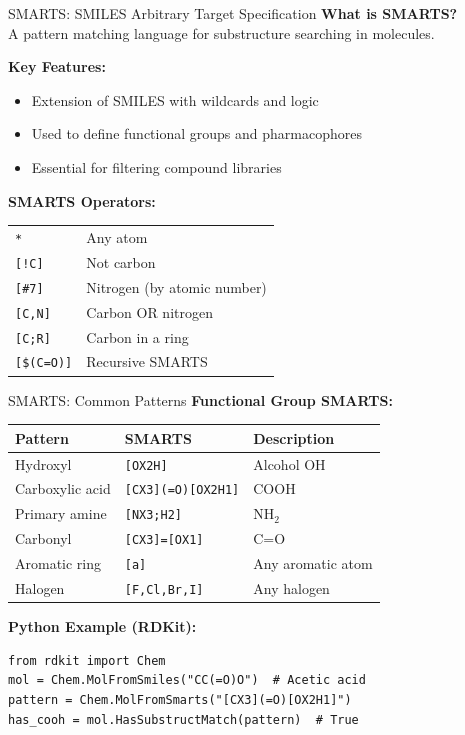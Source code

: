 \documentclass{beamer}
\begin{document}
\begin{frame}{SMARTS: SMILES Arbitrary Target Specification}
    \small
    \textbf{What is SMARTS?}\\
    A pattern matching language for substructure searching in molecules.
    \vspace{0.5em}
    
    \textbf{Key Features:}
    \begin{itemize}
        \item Extension of SMILES with wildcards and logic
        \item Used to define functional groups and pharmacophores
        \item Essential for filtering compound libraries
    \end{itemize}
    \vspace{0.3em}
    
    \textbf{SMARTS Operators:}
    \begin{tabular}{ll}
        \texttt{*} & Any atom \\
        \texttt{[!C]} & Not carbon \\
        \texttt{[\#7]} & Nitrogen (by atomic number) \\
        \texttt{[C,N]} & Carbon OR nitrogen \\
        \texttt{[C;R]} & Carbon in a ring \\
        \texttt{[\$(C=O)]} & Recursive SMARTS \\
    \end{tabular}
\end{frame}

\begin{frame}[fragile]{SMARTS: Common Patterns}
    \small
    \textbf{Functional Group SMARTS:}
    \vspace{0.3em}
    
    \begin{tabular}{lll}
        \textbf{Pattern} & \textbf{SMARTS} & \textbf{Description} \\
        \hline
        Hydroxyl & \texttt{[OX2H]} & Alcohol OH \\
        Carboxylic acid & \texttt{[CX3](=O)[OX2H1]} & COOH \\
        Primary amine & \texttt{[NX3;H2]} & NH$_2$ \\
        Carbonyl & \texttt{[CX3]=[OX1]} & C=O \\
        Aromatic ring & \texttt{[a]} & Any aromatic atom \\
        Halogen & \texttt{[F,Cl,Br,I]} & Any halogen \\
    \end{tabular}
    \vspace{0.5em}
    
    \textbf{Python Example (RDKit):}
    \begin{lstlisting}[style=codeStyle, basicstyle=\ttfamily\scriptsize]
from rdkit import Chem
mol = Chem.MolFromSmiles("CC(=O)O")  # Acetic acid
pattern = Chem.MolFromSmarts("[CX3](=O)[OX2H1]")
has_cooh = mol.HasSubstructMatch(pattern)  # True
    \end{lstlisting}
\end{frame}
\end{document}
